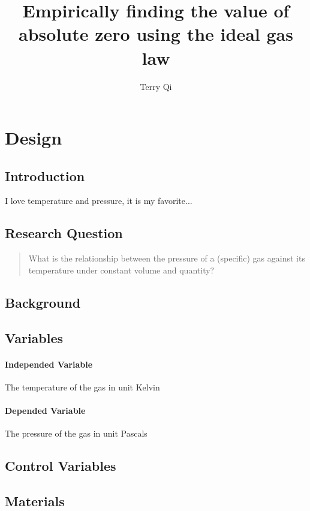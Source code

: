 \documentclass[a4paper,12pt]{article}
\title{Empirically finding the value of absolute zero using the ideal gas law}
\author{Terry Qi}
\begin{document}
\maketitle

\section{Design}
\subsection{Introduction}
I love temperature and pressure, it is my favorite...


\subsection{Research Question}
\begin{quote}
    What is the relationship between the pressure of a (specific) gas against its temperature under constant volume and quantity?
\end{quote}

\subsection{Background}

\subsection{Variables}
\paragraph{Independed Variable}
The temperature of the gas in unit Kelvin

\paragraph{Depended Variable}
The pressure of the gas in unit Pascals

\subsection{Control Variables}


\subsection{Materials}
\end{document}
